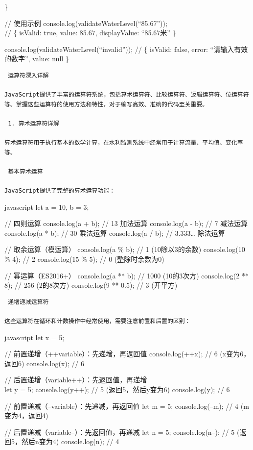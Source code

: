 \}

// 使用示例 console.log(validateWaterLevel(``85.67''));\\
// \{ isValid: true, value: 85.67, displayValue: ``85.67米'' \}

console.log(validateWaterLevel(``invalid'')); // \{ isValid: false, error: ``请输入有效的数字'', value: null \}

\begin{lstlisting}
 运算符深入详解

JavaScript提供了丰富的运算符系统，包括算术运算符、比较运算符、逻辑运算符、位运算符等。掌握这些运算符的使用方法和特性，对于编写高效、准确的代码至关重要。

 1. 算术运算符详解

算术运算符用于执行基本的数学计算，在水利监测系统中经常用于计算流量、平均值、变化率等。

 基本算术运算

JavaScript提供了完整的算术运算功能：
\end{lstlisting}

javascript let a = 10, b = 3;

// 四则运算 console.log(a + b); // 13 加法运算 console.log(a - b); // 7 减法运算 console.log(a * b); // 30 乘法运算 console.log(a / b); // 3.333\ldots{} 除法运算

// 取余运算（模运算） console.log(a \% b); // 1 (10除以3的余数) console.log(10 \% 4); // 2 console.log(15 \% 5); // 0 (整除时余数为0)

// 幂运算（ES2016+） console.log(a ** b); // 1000 (10的3次方) console.log(2 ** 8); // 256 (2的8次方) console.log(9 ** 0.5); // 3 (开平方)

\begin{lstlisting}
 递增递减运算符

这些运算符在循环和计数操作中经常使用，需要注意前置和后置的区别：
\end{lstlisting}

javascript let x = 5;

// 前置递增（++variable）：先递增，再返回值 console.log(++x); // 6 (x变为6，返回6) console.log(x); // 6

// 后置递增（variable++）：先返回值，再递增\\
let y = 5; console.log(y++); // 5 (返回5，然后y变为6) console.log(y); // 6

// 前置递减（--variable）：先递减，再返回值 let m = 5; console.log(--m); // 4 (m变为4，返回4)

// 后置递减（variable--）：先返回值，再递减 let n = 5; console.log(n--); // 5 (返回5，然后n变为4) console.log(n); // 4

